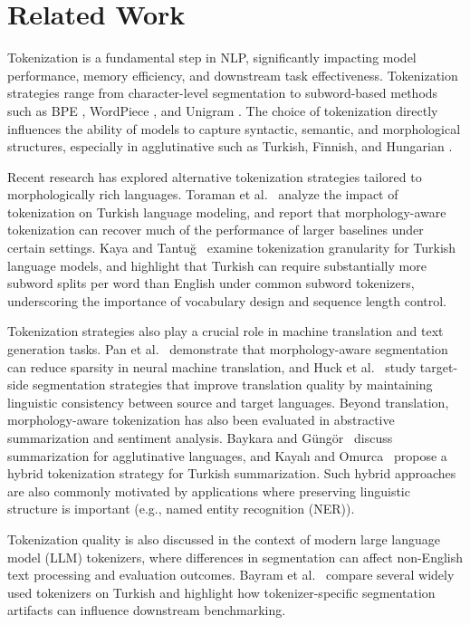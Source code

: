 \section{Related Work}
\label{sec:related_work}

Tokenization is a fundamental step in NLP, significantly impacting model performance, memory efficiency, and downstream task effectiveness. \cite{toraman_impact_2023} Tokenization strategies range from character-level segmentation to subword-based methods such as BPE \cite{sennrich_neural_2016}, WordPiece \cite{schuster_japanese_2012}, and Unigram \cite{kudo_subword_2018}. The choice of tokenization directly influences the ability of models to capture syntactic, semantic, and morphological structures, especially in agglutinative such as Turkish, Finnish, and Hungarian \cite{baykara_abstractive_2022, toraman_impact_2023}.

Recent research has explored alternative tokenization strategies tailored to morphologically rich languages. Toraman et al.~\cite{toraman_impact_2023} analyze the impact of tokenization on Turkish language modeling, and report that morphology-aware tokenization can recover much of the performance of larger baselines under certain settings. Kaya and Tantuğ~\cite{kaya_effect_2024} examine tokenization granularity for Turkish language models, and highlight that Turkish can require substantially more subword splits per word than English under common subword tokenizers, underscoring the importance of vocabulary design and sequence length control.

Tokenization strategies also play a crucial role in machine translation and text generation tasks. Pan et al.~\cite{pan_morphological_2020} demonstrate that morphology-aware segmentation can reduce sparsity in neural machine translation, and Huck et al.~\cite{huck_target_2017} study target-side segmentation strategies that improve translation quality by maintaining linguistic consistency between source and target languages. Beyond translation, morphology-aware tokenization has also been evaluated in abstractive summarization and sentiment analysis. Baykara and Güngör~\cite{baykara_abstractive_2022} discuss summarization for agglutinative languages, and Kayalı and Omurca~\cite{kayali_hybrid_2024} propose a hybrid tokenization strategy for Turkish summarization. Such hybrid approaches are also commonly motivated by applications where preserving linguistic structure is important (e.g., named entity recognition (NER)).

Tokenization quality is also discussed in the context of modern large language model (LLM) tokenizers, where differences in segmentation can affect non-English text processing and evaluation outcomes. Bayram et al.~\cite{bayram_tokenization_2025} compare several widely used tokenizers on Turkish and highlight how tokenizer-specific segmentation artifacts can influence downstream benchmarking.

